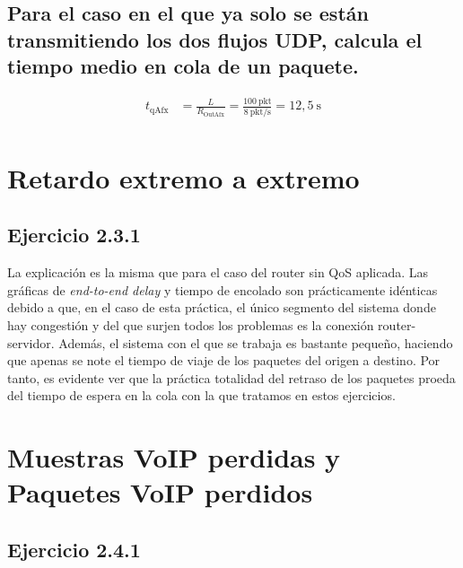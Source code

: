 \vspace{0,3cm}

\subsection{Para el caso en el que ya solo se están transmitiendo los dos flujos UDP, calcula el tiempo medio en cola de
un paquete.}
\[
    \begin{aligned}
        t_{\text{qAfx}} &= \frac{L}{R_{\text{OutAfx}}} = \frac{100~\text{pkt}}{8~\text{pkt/s}}= 12,5~\text{s} \\
    \end{aligned}
\]

\vspace{1cm}

\section{Retardo extremo a extremo}

\subsection{Ejercicio 2.3.1}
La explicación es la misma que para el caso del router sin QoS aplicada. Las gráficas de \textit{end-to-end delay}
y tiempo de encolado son prácticamente idénticas debido a que, en el caso de esta práctica, el único segmento del 
sistema donde hay congestión y del que surjen todos los problemas es la conexión router-servidor. Además, el sistema
con el que se trabaja es bastante pequeño, haciendo que apenas se note el tiempo de viaje de los paquetes del origen 
a destino. Por tanto, es evidente ver que la práctica totalidad del retraso de los paquetes proeda del tiempo de 
espera en la cola con la que tratamos en estos ejercicios.

\vspace{1cm}

\section{Muestras VoIP perdidas y Paquetes VoIP perdidos}

\subsection{Ejercicio 2.4.1}
